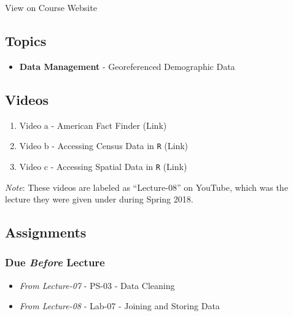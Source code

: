 \documentclass[]{book}
\providecommand{\tightlist}{%
  \setlength{\itemsep}{0pt}\setlength{\parskip}{0pt}}
\begin{document}
View on Course Website

\hypertarget{topics-9}{%
\subsection*{Topics}\label{topics-9}}

\begin{itemize}
\tightlist
\item
  \textbf{Data Management} - Georeferenced Demographic Data
\end{itemize}

\hypertarget{videos-1}{%
\subsection*{Videos}\label{videos-1}}

\begin{enumerate}
\def\labelenumi{\arabic{enumi}.}
\tightlist
\item
  Video a - American Fact Finder (Link)
\item
  Video b - Accessing Census Data in \texttt{R} (Link)
\item
  Video c - Accessing Spatial Data in \texttt{R} (Link)
\end{enumerate}

\emph{Note}: These videos are labeled as ``Lecture-08'' on YouTube, which was the lecture they were given under during Spring 2018.

\hypertarget{assignments-10}{%
\subsection*{Assignments}\label{assignments-10}}

\hypertarget{due-before-lecture-8}{%
\subsubsection*{\texorpdfstring{Due \emph{Before} Lecture}{Due Before Lecture}}\label{due-before-lecture-8}}

\begin{itemize}
\tightlist
\item
  \emph{From Lecture-07} - PS-03 - Data Cleaning
\item
  \emph{From Lecture-08} - Lab-07 - Joining and Storing Data
\end{itemize}
\end{document}
